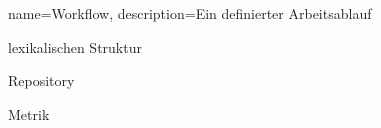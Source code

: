  {
	name=Workflow,
	description={Ein definierter Arbeitsablauf}
}

lexikalischen Struktur

Repository

Metrik